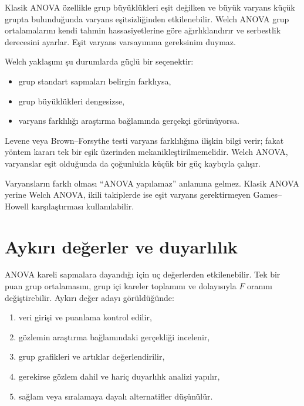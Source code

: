 Klasik ANOVA özellikle grup büyüklükleri eşit değilken ve büyük varyans küçük
grupta bulunduğunda varyans eşitsizliğinden etkilenebilir. Welch ANOVA grup
ortalamalarını kendi tahmin hassasiyetlerine göre ağırlıklandırır ve
serbestlik derecesini ayarlar. Eşit varyans varsayımına gereksinim duymaz.

Welch yaklaşımı şu durumlarda güçlü bir seçenektir:

\begin{itemize}
  \item grup standart sapmaları belirgin farklıysa,
  \item grup büyüklükleri dengesizse,
  \item varyans farklılığı araştırma bağlamında gerçekçi görünüyorsa.
\end{itemize}

Levene veya Brown--Forsythe testi varyans farklılığına ilişkin bilgi verir;
fakat yöntem kararı tek bir eşik üzerinden mekanikleştirilmemelidir. Welch
ANOVA, varyanslar eşit olduğunda da çoğunlukla küçük bir güç kaybıyla çalışır.

\begin{mistakebox}
Varyansların farklı olması ``ANOVA yapılamaz'' anlamına gelmez. Klasik ANOVA
yerine Welch ANOVA, ikili takiplerde ise eşit varyans gerektirmeyen
Games--Howell karşılaştırması kullanılabilir.
\end{mistakebox}

\section{Aykırı değerler ve duyarlılık}

ANOVA kareli sapmalara dayandığı için uç değerlerden etkilenebilir. Tek bir
puan grup ortalamasını, grup içi kareler toplamını ve dolayısıyla $F$ oranını
değiştirebilir. Aykırı değer adayı görüldüğünde:

\begin{enumerate}
  \item veri girişi ve puanlama kontrol edilir,
  \item gözlemin araştırma bağlamındaki gerçekliği incelenir,
  \item grup grafikleri ve artıklar değerlendirilir,
  \item gerekirse gözlem dahil ve hariç duyarlılık analizi yapılır,
  \item sağlam veya sıralamaya dayalı alternatifler düşünülür.
\end{enumerate}


